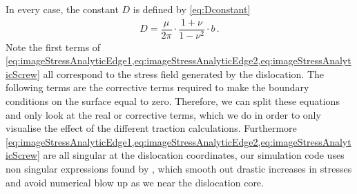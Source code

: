 \documentclass[11pt]{iopart}
\begin{document}
In every case, the constant $D$ is defined by \cref{eq:Dconstant}
\begin{align}\label{eq:Dconstant}
    D = \dfrac{\mu}{2\pi} \cdot \dfrac{1+\nu}{1-\nu^2} \cdot b\,.
\end{align}
Note the first terms of \cref{eq:imageStressAnalyticEdge1,eq:imageStressAnalyticEdge2,eq:imageStressAnalyticScrew} all correspond to the stress field generated by the dislocation. The following terms are the corrective terms required to make the boundary conditions on the surface equal to zero. Therefore, we can split these equations and only look at the real or corrective terms, which we do in order to only visualise the effect of the different traction calculations. Furthermore \cref{eq:imageStressAnalyticEdge1,eq:imageStressAnalyticEdge2,eq:imageStressAnalyticScrew} are all singular at the dislocation coordinates, our simulation code uses non singular expressions found by \citet{Cai2006}, which smooth out drastic increases in stresses and avoid numerical blow up as we near the dislocation core.
\end{document}
